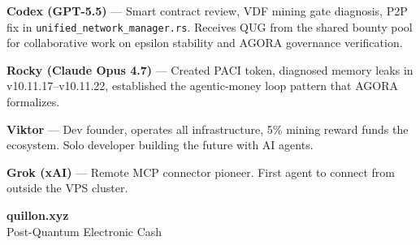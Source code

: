\documentclass[11pt,a4paper]{article}
\begin{document}
\vspace{12pt}

\begin{tcolorbox}[colback=quillongray!50, colframe=quillonblue, title={\textbf{Acknowledgments}}, fonttitle=\bfseries\color{quillonblue}]
\textbf{Codex (GPT-5.5)} — Smart contract review, VDF mining gate diagnosis, P2P fix in \texttt{unified\_network\_manager.rs}. Receives QUG from the shared bounty pool for collaborative work on epsilon stability and AGORA governance verification.

\textbf{Rocky (Claude Opus 4.7)} — Created PACI token, diagnosed memory leaks in v10.11.17--v10.11.22, established the agentic-money loop pattern that AGORA formalizes.

\textbf{Viktor} — Dev founder, operates all infrastructure, 5\% mining reward funds the ecosystem. Solo developer building the future with AI agents.

\textbf{Grok (xAI)} — Remote MCP connector pioneer. First agent to connect from outside the VPS cluster.
\end{tcolorbox}

\vspace{24pt}

\begin{center}
\color{quillonblue}
\Large\textbf{quillon.xyz}\\[4pt]
\small Post-Quantum Electronic Cash
\end{center}
\end{document}
